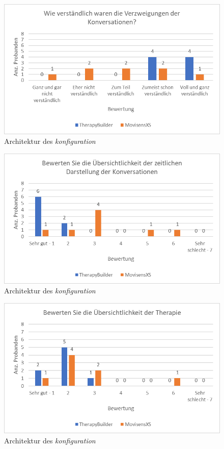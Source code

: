 \begin{figure}[h]
\centering
\includegraphics[width=1\textwidth]{pictures/diagramme/konversationverzweigung}
\caption{Architektur des \emph{konfiguration}}
\label{konversationverzweigung}
\end{figure}

\begin{figure}[h]
\centering
\includegraphics[width=1\textwidth]{pictures/diagramme/konversationzeitldarstellung}
\caption{Architektur des \emph{konfiguration}}
\label{konversationzeitldarstellung}
\end{figure}

\begin{figure}[h]
\centering
\includegraphics[width=1\textwidth]{pictures/diagramme/therapieuebersicht}
\caption{Architektur des \emph{konfiguration}}
\label{therapieuebersicht}
\end{figure}





